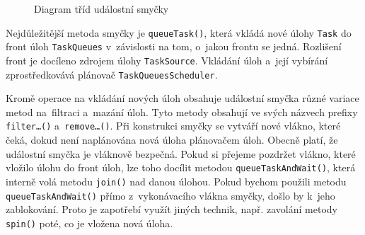 \begin{figure}[H]
  \begin{center}
    \caption{Diagram tříd událostní smyčky}
    \label{Figure.EventLoop}
  \end{center}
\end{figure}

Nejdůležitější metoda smyčky je \texttt{queueTask()}, která vkládá nové úlohy \texttt{Task} do front úloh \texttt{TaskQueues} v~závislosti na tom, o~jakou frontu se jedná. Rozlišení front je docíleno zdrojem úlohy \texttt{TaskSource}. Vkládání úloh a~její vybírání zprostředkovává plánovač \texttt{TaskQueuesScheduler}.
 
Kromě operace na vkládání nových úloh obsahuje událostní smyčka různé variace metod na~filtraci a~mazání úloh. Tyto metody obsahují ve svých názvech prefixy \texttt{filter\ldots()} a~\texttt{remove\ldots()}. Při konstrukci smyčky se vytváří nové vlákno, které čeká, dokud není naplánována nová úloha plánovačem úloh. Obecně platí, že událostní smyčka je vláknově bezpečná. Pokud si přejeme pozdržet vlákno, které vložilo úlohu do front úloh, lze toho docílit metodou \texttt{queueTaskAndWait()}, která interně volá metodu \texttt{join()} nad danou úlohou. Pokud bychom použili metodu \texttt{queueTaskAndWait()} přímo z~vykonávacího vlákna smyčky, došlo by k~jeho zablokování. Proto je zapotřebí využít jiných technik, např. zavolání metody \texttt{spin()} poté, co je vložena nová úloha.


